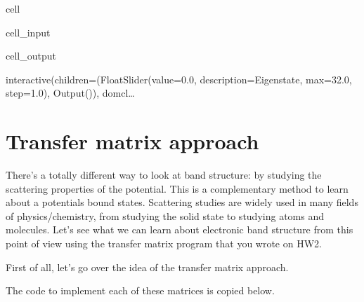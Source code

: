 \documentclass[letterpaper,10pt,english]{jupyterBook}
\begin{document}
\begin{sphinxuseclass}{cell}
\begin{sphinxVerbatimInput}
\begin{sphinxuseclass}{cell_input}
\begin{sphinxVerbatim}[commandchars=\\\{\}]
\end{sphinxVerbatim}

\end{sphinxuseclass}\end{sphinxVerbatimInput}
\begin{sphinxVerbatimOutput}

\begin{sphinxuseclass}{cell_output}
\begin{sphinxVerbatim}[commandchars=\\\{\}]
interactive(children=(FloatSlider(value=0.0, description=\PYGZsq{}Eigenstate\PYGZsq{}, max=32.0, step=1.0), Output()), \PYGZus{}dom\PYGZus{}cl…
\end{sphinxVerbatim}

\end{sphinxuseclass}\end{sphinxVerbatimOutput}

\end{sphinxuseclass}
\sphinxAtStartPar
{}


\section{Transfer matrix approach}
\label{\detokenize{Section6_v2:transfer-matrix-approach}}
\sphinxAtStartPar
There’s a totally different way to look at band structure: by studying the scattering properties of the potential. This is a complementary method to learn about a potentials bound states. Scattering studies are widely used in many fields of physics/chemistry, from studying the solid state to studying atoms and molecules. Let’s see what we can learn about electronic band structure from this point of view using the transfer matrix program that you wrote on HW2.

\sphinxAtStartPar
First of all, let’s go over the idea of the transfer matrix approach.

\sphinxAtStartPar
{}

\sphinxAtStartPar
The code to implement each of these matrices is copied below.
\end{document}
